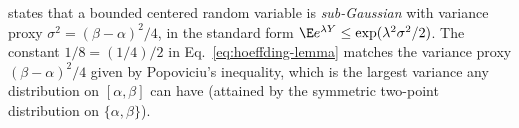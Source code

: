 \begin{remark}\label{rem:subgaussian}
 states that a bounded centered random variable is
\emph{sub-Gaussian} with variance proxy $\sigma^2 = (\beta - \alpha)^2/4$, in the
standard form $\E e^{\lambda Y} \le \exp(\lambda^2 \sigma^2 / 2)$. The constant
$1/8 = (1/4)/2$ in Eq.~\eqref{eq:hoeffding-lemma} matches the variance proxy $(\beta -
\alpha)^2 / 4$ given by Popoviciu's inequality, which is the largest variance any
distribution on $[\alpha, \beta]$ can have (attained by the symmetric two-point
distribution on $\{\alpha, \beta\}$).
\end{remark}

